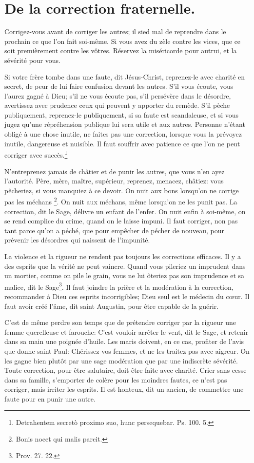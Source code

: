 \documentclass[instructions.tex]{subfiles}
\begin{document}
 
\chapter{De la correction fraternelle.}
 
\primo Corrigez-vous avant de corriger les autres; il sied mal de reprendre dans le prochain ce que l’on fait soi-même. Si vous avez du zèle contre les vices, que ce soit premièrement contre les vôtres. Réservez la miséricorde pour autrui, et la sévérité pour vous.
 
Si votre frère tombe dans une faute, dit Jésus-Christ, reprenez-le avec charité en secret, de peur de lui faire confusion devant les autres. S’il vous écoute, vous l’aurez gagné à Dieu; s’il ne vous écoute pas, s’il persévère dans le désordre, avertissez avec prudence ceux qui peuvent y apporter du remède. S’il pèche publiquement, reprenez-le publiquement, si sa faute est scandaleuse, et si vous jugez qu’une répréhension publique lui sera utile et aux autres. Personne n’étant obligé à une chose inutile, ne faites pas une correction, lorsque vous la prévoyez inutile, dangereuse et nuisible. Il faut souffrir avec patience ce que l’on ne peut corriger avec succès.\footnote{Detrahentem secretò proximo suo, hunc persequebar. Ps. 100. 5.}
 
\secundo N’entreprenez jamais de châtier et de punir les autres, que vous n’en ayez l’autorité. Père, mère, maître, supérieur, reprenez, menacez, châtiez: vous pêcheriez, si vous manquiez à ce devoir. On nuit aux bons lorsqu’on ne corrige pas les méchans \footnote{Bonis nocet qui malis parcit.}. On nuit aux méchans, même lorsqu’on ne les punit pas. La correction, dit le Sage, délivre un enfant de l’enfer. On nuit enfin à soi-même, on se rend complice du crime, quand on le laisse impuni. Il faut corriger, non pas tant parce qu’on a péché, que pour empêcher de pécher de nouveau, pour prévenir les désordres qui naissent de l’impunité.
 
La violence et la rigueur ne rendent pas toujours les corrections efficaces. Il y a des esprits que la vérité ne peut vaincre. Quand vous pileriez un imprudent dans un mortier, comme on pile le grain, vous ne lui ôteriez pas son imprudence et sa malice, dit le Sage\footnote{Prov. 27. 22.}. Il faut joindre la prière et la modération à la correction, recommander à Dieu ces esprits incorrigibles; Dieu seul est le médecin du cœur. Il faut avoir créé l’âme, dit saint Augustin, pour être capable de la guérir.
 
C’est de même perdre son temps que de prétendre corriger par la rigueur une femme querelleuse et farouche: C’est vouloir arrêter le vent, dit le Sage, et retenir dans sa main une poignée d’huile. Les maris doivent, en ce cas, profiter de l’avis que donne saint Paul: Chérissez vos femmes, et ne les traitez pas avec aigreur. On les gagne bien plutôt par une sage modération que par une indiscrète sévérité. Toute correction, pour être salutaire, doit être faite avec charité. Crier sans cesse dans sa famille, s’emporter de colère pour les moindres fautes, ce n’est pas corriger, mais irriter les esprits. Il est honteux, dit un ancien, de commettre une faute pour en punir une autre.
 
\end{document}
